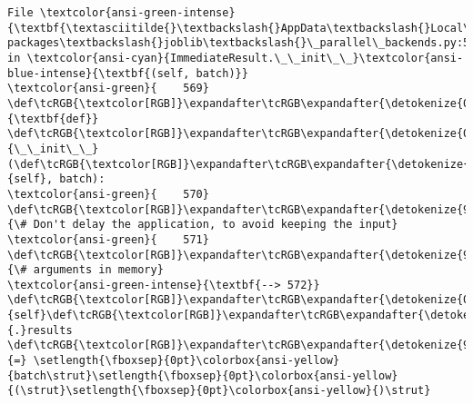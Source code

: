\documentclass[11pt]{article}
\begin{document}
\begin{Verbatim}[commandchars=\\\{\}, frame=single, framerule=2mm, rulecolor=\color{outerrorbackground}]
File \textcolor{ansi-green-intense}{\textbf{\textasciitilde{}\textbackslash{}AppData\textbackslash{}Local\textbackslash{}anaconda3\textbackslash{}lib\textbackslash{}site-packages\textbackslash{}joblib\textbackslash{}\_parallel\_backends.py:572}}, in \textcolor{ansi-cyan}{ImmediateResult.\_\_init\_\_}\textcolor{ansi-blue-intense}{\textbf{(self, batch)}}
\textcolor{ansi-green}{    569} \def\tcRGB{\textcolor[RGB]}\expandafter\tcRGB\expandafter{\detokenize{0,135,0}}{\textbf{def}} \def\tcRGB{\textcolor[RGB]}\expandafter\tcRGB\expandafter{\detokenize{0,0,255}}{\_\_init\_\_}(\def\tcRGB{\textcolor[RGB]}\expandafter\tcRGB\expandafter{\detokenize{0,135,0}}{self}, batch):
\textcolor{ansi-green}{    570}     \def\tcRGB{\textcolor[RGB]}\expandafter\tcRGB\expandafter{\detokenize{95,135,135}}{\# Don't delay the application, to avoid keeping the input}
\textcolor{ansi-green}{    571}     \def\tcRGB{\textcolor[RGB]}\expandafter\tcRGB\expandafter{\detokenize{95,135,135}}{\# arguments in memory}
\textcolor{ansi-green-intense}{\textbf{--> 572}}     \def\tcRGB{\textcolor[RGB]}\expandafter\tcRGB\expandafter{\detokenize{0,135,0}}{self}\def\tcRGB{\textcolor[RGB]}\expandafter\tcRGB\expandafter{\detokenize{98,98,98}}{.}results \def\tcRGB{\textcolor[RGB]}\expandafter\tcRGB\expandafter{\detokenize{98,98,98}}{=} \setlength{\fboxsep}{0pt}\colorbox{ansi-yellow}{batch\strut}\setlength{\fboxsep}{0pt}\colorbox{ansi-yellow}{(\strut}\setlength{\fboxsep}{0pt}\colorbox{ansi-yellow}{)\strut}


\end{Verbatim}
\end{document}
